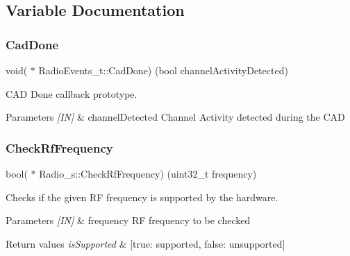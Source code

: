 \subsection{Variable Documentation}
\mbox{\label{group__LORA_gacf79a39fe3d615bed87b1414e73df6b2}} 
\subsubsection{\texorpdfstring{Cad\+Done}{CadDone}}
{\footnotesize\ttfamily void( $\ast$ Radio\+Events\+\_\+t\+::\+Cad\+Done) (bool channel\+Activity\+Detected)}



C\+AD Done callback prototype. 


\begin{DoxyParams}{Parameters}
{\em \mbox{[}\+I\+N\mbox{]}} & channel\+Detected Channel Activity detected during the C\+AD \\
\hline
\end{DoxyParams}
\mbox{\label{group__LORA_gad26df1cecc02c5d50f07ff062962f501}} 
\subsubsection{\texorpdfstring{Check\+Rf\+Frequency}{CheckRfFrequency}}
{\footnotesize\ttfamily bool( $\ast$ Radio\+\_\+s\+::\+Check\+Rf\+Frequency) (uint32\+\_\+t frequency)}



Checks if the given RF frequency is supported by the hardware. 


\begin{DoxyParams}{Parameters}
{\em \mbox{[}\+I\+N\mbox{]}} & frequency RF frequency to be checked \\
\hline
\end{DoxyParams}

\begin{DoxyRetVals}{Return values}
{\em is\+Supported} & \mbox{[}true\+: supported, false\+: unsupported\mbox{]} \\
\hline
\end{DoxyRetVals}
\mbox{\label{group__LORA_ga1c7fd427d45e18c386c0dc10b496d74b}} 
